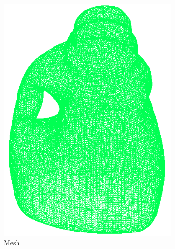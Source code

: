 \begin{figure}[!t]
  \centering
  \begin{subfigure}{0.3\linewidth}
    \centering
    \includegraphics[width=0.9\linewidth]{Figures/ObjRecog/detergent_mesh.png}
    \caption{Mesh}
    \label{fig:objrecog:meshcloudgrid:mesh}
  \end{subfigure}
  \begin{subfigure}{0.3\linewidth}
    \centering

\end{subfigure}
\end{figure}
